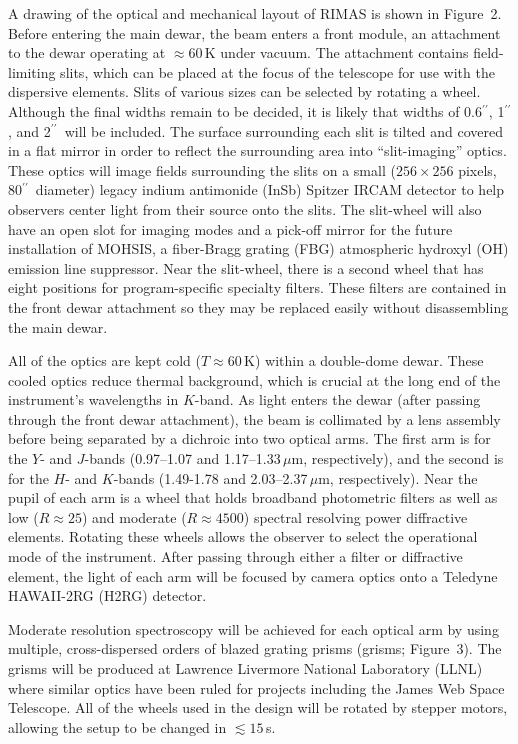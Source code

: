 \documentclass[letterpaper,11pt]{article}
\newcommand{\arcsec}{\mbox{$^{\prime\prime}$}}%
\begin{document}
A drawing of the optical and mechanical layout of RIMAS is shown in Figure~2.
Before entering the main dewar, the beam enters a front module, an attachment to the 
dewar operating at $\approx 60$\,K under vacuum. The attachment contains field-limiting 
slits, which can be placed at the focus of the telescope for use with the 
dispersive elements. Slits of various sizes can be selected by rotating a wheel. 
Although the final widths remain to be decided, it is likely that widths of 0.6\arcsec, 
1\arcsec, and 2\arcsec\ will be included. The surface surrounding each slit is 
tilted and covered in a flat mirror in order to reflect the surrounding area
into ``slit-imaging'' optics.  These optics will image fields surrounding the 
slits on a small ($256 \times 256$ pixels, 80\arcsec\ diameter) legacy indium antimonide 
(InSb) Spitzer IRCAM detector to help observers center light from their source 
onto the slits.  The slit-wheel will 
also have an open slot for imaging modes and a pick-off mirror for the future 
installation of MOHSIS, a fiber-Bragg grating (FBG) atmospheric hydroxyl (OH) emission 
line suppressor. Near the slit-wheel, there is a second wheel that has eight positions 
for program-specific specialty filters. These filters are contained in the front dewar 
attachment so they may be replaced easily without disassembling the main dewar.



All of the optics are kept cold ($T \approx 60$\,K) within a
double-dome dewar. These cooled optics reduce 
thermal background, which is crucial at the long end of the instrument’s 
wavelengths in $K$-band. As light enters the dewar (after passing through the front 
dewar attachment), the beam is collimated by a lens assembly before being separated by a 
dichroic into two optical arms. The first arm is for the $Y$- and $J$-bands 
(0.97--1.07 and 1.17--1.33\,$\mu$m, respectively), and the second is for the $H$- 
and $K$-bands (1.49-1.78 and 2.03--2.37\,$\mu$m, respectively). Near the pupil of each 
arm is a wheel that holds broadband photometric filters as well as low ($R \approx
25$) and moderate ($R \approx 4500$) spectral resolving power diffractive elements. 
Rotating these wheels allows the observer to select the operational mode of the 
instrument. After passing through either a filter or diffractive element, the light of 
each arm will be focused by camera optics onto a Teledyne HAWAII-2RG (H2RG) detector.

Moderate resolution spectroscopy will be achieved for each optical arm by using 
multiple, cross-dispersed orders of blazed grating prisms (grisms; Figure~3).  
The grisms will be produced at Lawrence 
Livermore National Laboratory (LLNL) where similar optics have been ruled for projects 
including the James Web Space Telescope.  All of the wheels used in the design will be rotated by stepper motors, allowing the setup to be changed in $\lesssim 15$\,s.
\end{document}
